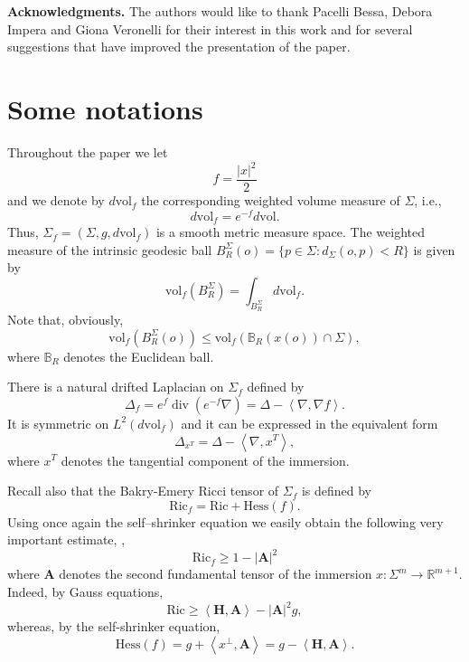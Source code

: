 \documentclass[11pt,leqno]{amsart}\usepackage{amsmath}
\numberwithin{equation}{section}
\begin{document}
\bigskip

\noindent \textbf{Acknowledgments.} The authors would like to thank Pacelli Bessa, Debora Impera and Giona Veronelli for their interest in this work and for several suggestions that have improved the presentation of the paper.
\section{Some notations}

Throughout the paper we let\[
f=\frac{\left\vert x\right\vert ^{2}}{2}\]
and we denote by $d\mathrm{vol}_{f}$ the corresponding weighted volume measure of $\Sigma$, i.e.,\[
d\mathrm{vol}_f=e^{-f}d\mathrm{vol}.
\]
Thus, $\Sigma_{f}=\left(  \Sigma,g,d\mathrm{vol}_{f}\right)  $ is a smooth metric measure
space. The weighted measure of the intrinsic geodesic ball $B_{R}^{\Sigma}(o)=\{p\in \Sigma:d_\Sigma(o,p)<R\}$ is
given by\[
\mathrm{vol}_{f}\left(  B_{R}^{\Sigma}\right)  =\int_{B_{R}^{\Sigma}}d\mathrm{vol}_{f}.
\]
Note that, obviously,
\[
\mathrm{vol}_{f}\left(  B_{R}^{\Sigma}(o)\right) \leq \mathrm{vol}_{f}\left( \mathbb{B}_{R}(x(o))\cap \Sigma \right),
\]
where $\mathbb{B}_{R}$ denotes the Euclidean ball.

There is a natural drifted Laplacian on $\Sigma_{f}$ defined by\[
\Delta_{f}=e^{f}\operatorname{div}\left(  e^{-f}\nabla\right)  =\Delta
-\left\langle \nabla,\nabla f\right\rangle .
\]
It is symmetric on $L^{2}\left(  d\mathrm{vol}_{f}\right)  $ and it can be expressed in the equivalent form\[
\Delta_{x^{T}}=\Delta-\left\langle \nabla,x^{T}\right\rangle ,
\]
where $x^{T}$ denotes the tangential component of the immersion.

Recall also that the Bakry-Emery Ricci tensor of $\Sigma_{f}$ is defined by\[
\mathrm{Ric}_{f}=\mathrm{Ric}+\mathrm{Hess}\left(  f\right)  .
\]
Using once again the self--shrinker equation we easily obtain the following
very important estimate,  \cite{Ri-self},\begin{equation}
\mathrm{Ric}_{f}\geq1-\left\vert \mathbf{A}\right\vert ^{2}\label{ric_f}\end{equation}
where $\mathbf{A}$ denotes the second fundamental tensor of the immersion
$x\colon \Sigma^{m}\rightarrow\mathbb{R}^{m+1}$. Indeed, by Gauss equations,\[
\mathrm{Ric}\geq\left\langle \mathbf{H},\mathbf{A}\right\rangle -\left\vert
\mathbf{A}\right\vert ^{2}g,
\]
whereas, by the self-shrinker equation,\[
\mathrm{Hess}(f)
=g+\left\langle x^{\bot},\mathbf{A}\right\rangle =g-\left\langle
\mathbf{H},\mathbf{A}\right\rangle .
\]
\end{document}
